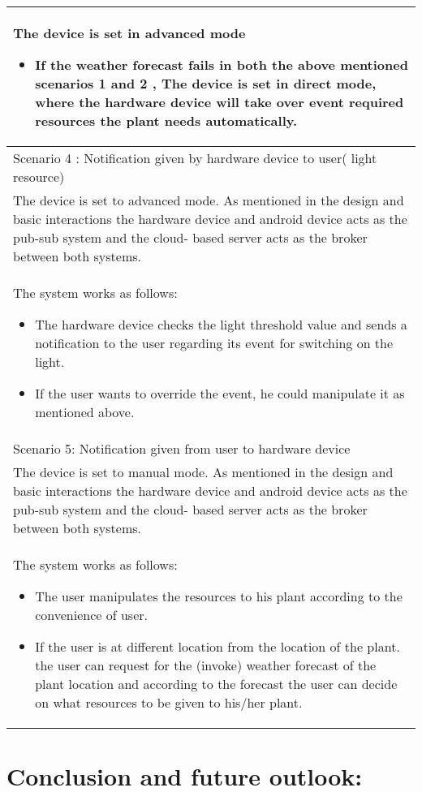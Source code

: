 \documentclass[10pt]{article}
\begin{document}
\begin{longtable}{p{}}
The device is set in advanced mode 
\begin{itemize}

\item If the weather forecast fails in both the above mentioned scenarios 1 and 2 , The device is set in direct mode, where the hardware device will take over event required resources the plant needs automatically.
\end{itemize}
\\
\hline

Scenario 4 : Notification given by hardware device to user( light resource)\\
\hline 

The device is set to advanced mode.
As mentioned in the design and basic interactions the hardware device and android device acts as the pub-sub system and the cloud- based server acts as the broker between both systems. \\The system works as follows:
\begin{itemize}
\item The hardware device checks the light threshold value and sends a notification to the user regarding its event for switching on the light.
\item If the user wants to override the event, he could manipulate it as mentioned above.
\end{itemize}\\ 
\hline
Scenario 5: Notification given from user to hardware device\\
\hline
The device is set to manual mode.
As mentioned in the design and basic interactions the hardware device and android device acts as the pub-sub system and the cloud- based server acts as the broker between both systems.\\
 The system works as follows:
\begin{itemize}
\item The user manipulates the resources to his plant according to the convenience of user.
\item If the user is at different location from the location of the plant. the user can request for the (invoke) weather forecast of the plant location and according to the forecast the user can decide on what resources to be given to his/her plant.
\end{itemize}
\\
\hline
\end{longtable}

\section*{Conclusion and future outlook:}
\end{document}
